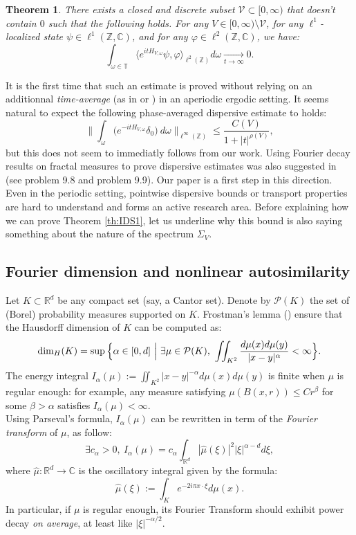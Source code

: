 \documentclass[a4paper]{article}
\newtheorem{theorem}{Theorem}[section]
\theoremstyle{definition}
\begin{document}
\begin{theorem}\label{dispersion}
There exists a closed and discrete subset $\mathcal{V}\subset [0,\infty)$ that doesn't contain $0$ such that the following holds. For any $V \in [0,\infty) \setminus \mathcal{V}$, for any $\ell^1$-localized state $\psi \in \ell^1(\mathbb{Z},\mathbb{C})$, and for any $\varphi \in \ell^2(\mathbb{Z},\mathbb{C})$, we have:
$$ \int_{\omega \in \mathbb{T}} \langle e^{itH_{V,\omega}} \psi, \varphi \rangle_{\ell^2(\mathbb{Z})} d\omega \underset{t \rightarrow \infty}{\longrightarrow} 0 .$$
\end{theorem}


It is the first time that such an estimate is proved without relying on an additionnal \emph{time-average} (as in \cite{La96} or \cite{DG12}) in an aperiodic ergodic setting. It seems natural to expect the following phase-averaged dispersive estimate to holds:
$$  \Big\| \int_\omega \Big(e^{-it H_{V,\omega}} \delta_0 \Big) \ d\omega \Big\|_{\ell^\infty(\mathbb{Z})} \leq \frac{C(V)}{1+|t|^{\rho(V)}} ,$$
but this does not seem to immediatly follows from our work.  Using Fourier decay results on fractal measures to prove dispersive estimates was also suggested in \cite{KPST25} (see problem 9.8 and problem 9.9). Our paper is a first step in this direction.
Even in the periodic setting, pointwise dispersive bounds or transport properties \cite{AK98,DLY15,GM21,DMY24,DFY25} are hard to understand and forms an active research area. Before explaining how we can prove Theorem \ref{th:IDS1}, let us underline why this bound is also saying something about the  nature of the spectrum $\Sigma_V$.

\subsection{Fourier dimension and nonlinear autosimilarity}

Let $K \subset \mathbb{R}^d$ be any compact set (say, a Cantor set). Denote by $\mathcal{P}(K)$ the set of (Borel) probability measures supported on $K$. Frostman's lemma (\cite{Fro35,Ma15}) ensure that the Hausdorff dimension of $K$ can be computed as:
$$ \text{dim}_H(K) = \sup \Big\{\alpha \in [0,d] \ \Big{|} \ \exists \mu \in \mathcal{P}(K), \ \iint_{K^2} \frac{d\mu(x) d\mu(y)}{|x-y|^\alpha} < \infty \Big\} .$$
The energy integral $I_\alpha(\mu) :=  \iint_{K^2} |x-y|^{-\alpha} d\mu(x) d\mu(y)$ is finite when $\mu$ is regular enough: for example, any measure satisfying $\mu(B(x,r)) \leq C r^\beta$ for some $\beta>\alpha$ satisfies $I_\alpha(\mu)<\infty$. \\
Using Parseval's formula, $I_\alpha(\mu)$ can be rewritten in term of the \emph{Fourier transform} of $\mu$, as follow:
$$ \exists c_\alpha > 0, \ I_\alpha(\mu) = c_\alpha \int_{\mathbb{R}^d} |\widehat{\mu}(\xi)|^2 |\xi|^{\alpha-d} d\xi ,$$
where $\widehat{\mu}:\mathbb{R}^d \rightarrow \mathbb{C}$ is the oscillatory integral given by the formula:
$$ \widehat{\mu}(\xi) := \int_K e^{-2i\pi x \cdot \xi} d\mu(x). $$
In particular, if $\mu$ is regular enough, its Fourier Transform should exhibit power decay \emph{on average}, at least like $|\xi|^{-\alpha/2}$. \\
\end{document}
